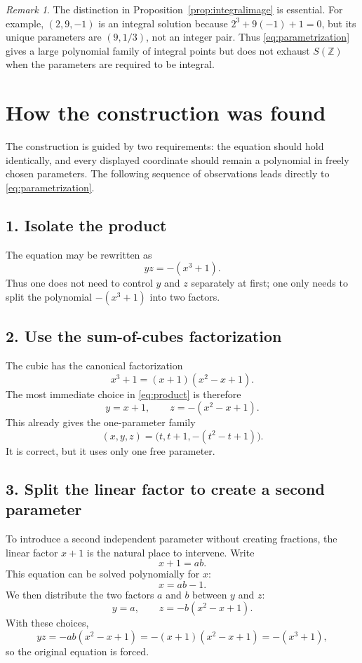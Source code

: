 \documentclass[11pt]{article}
\theoremstyle{remark}
\newtheorem{remark}[theorem]{Remark}
\newcommand{\Z}{\mathbb{Z}}
\begin{document}
\begin{remark}\label{rem:notallintegral}
The distinction in Proposition~\ref{prop:integralimage} is essential.
For example, $(2,9,-1)$ is an integral solution because
$2^3+9(-1)+1=0$, but its unique parameters are $(9,1/3)$, not an
integer pair.  Thus \eqref{eq:parametrization} gives a large polynomial
family of integral points but does not exhaust $S(\Z)$ when the
parameters are required to be integral.
\end{remark}

\section{How the construction was found}\label{sec:discovery}

The construction is guided by two requirements: the equation should
hold identically, and every displayed coordinate should remain a
polynomial in freely chosen parameters.  The following sequence of
observations leads directly to \eqref{eq:parametrization}.

\subsection*{1. Isolate the product}
The equation may be rewritten as
\begin{equation}\label{eq:product}
 yz=-(x^3+1).
\end{equation}
Thus one does not need to control $y$ and $z$ separately at first; one
only needs to split the polynomial $-(x^3+1)$ into two factors.

\subsection*{2. Use the sum-of-cubes factorization}
The cubic has the canonical factorization
\[
 x^3+1=(x+1)(x^2-x+1).
\]
The most immediate choice in \eqref{eq:product} is therefore
\[
 y=x+1,
 \qquad
 z=-(x^2-x+1).
\]
This already gives the one-parameter family
\[
 (x,y,z)=\bigl(t,t+1,-(t^2-t+1)\bigr).
\]
It is correct, but it uses only one free parameter.

\subsection*{3. Split the linear factor to create a second parameter}
To introduce a second independent parameter without creating
fractions, the linear factor $x+1$ is the natural place to intervene.
Write
\begin{equation}\label{eq:split}
 x+1=ab.
\end{equation}
This equation can be solved polynomially for $x$:
\[
 x=ab-1.
\]
We then distribute the two factors $a$ and $b$ between $y$ and $z$:
\[
 y=a,
 \qquad
 z=-b(x^2-x+1).
\]
With these choices,
\[
 yz=-ab(x^2-x+1)=-(x+1)(x^2-x+1)=-(x^3+1),
\]
so the original equation is forced.
\end{document}
